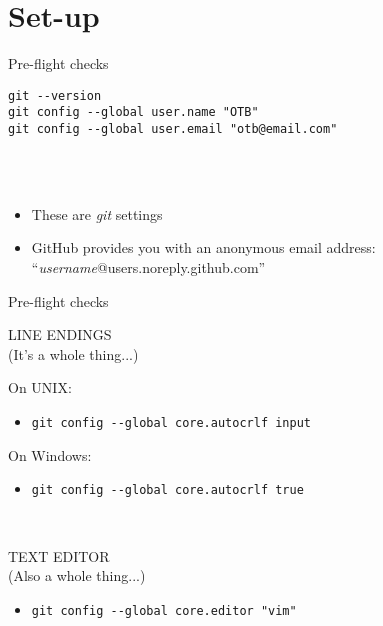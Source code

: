 \documentclass[presentation]{beamer}
\begin{document}
\section{Set-up}
\begin{frame}[fragile]{Pre-flight checks}
\begin{lstlisting}
git --version
git config --global user.name "OTB"
git config --global user.email "otb@email.com"
\end{lstlisting}
\hfill \\
\hfill \\
\begin{itemize}
	\item These are \emph{git} settings
	\item GitHub provides you with an anonymous email address: ``\emph{username}@users.noreply.github.com''
\end{itemize}

\end{frame}

\begin{frame}{Pre-flight checks}
\begin{center}
LINE ENDINGS \\
(It's a whole thing...)
\end{center}

On UNIX:
\begin{itemize}
	\item \lstinline$git config --global core.autocrlf input$
\end{itemize}

On Windows:
\begin{itemize}
	\item \lstinline$git config --global core.autocrlf true$
\end{itemize}
\hfill \\
\begin{center}
TEXT EDITOR \\
(Also a whole thing...)
\end{center}

\begin{itemize}
	\item \lstinline$git config --global core.editor "vim"$
\end{itemize}

\end{frame}
\end{document}
